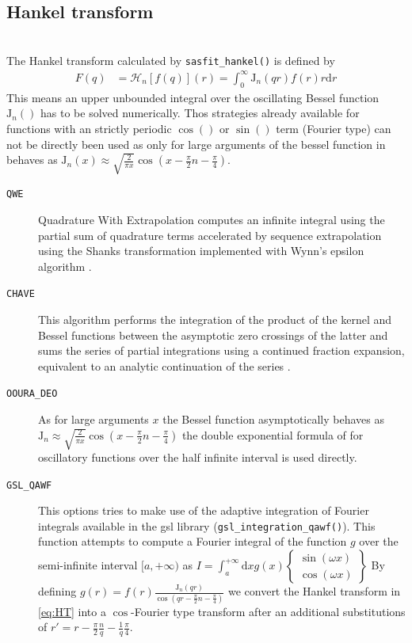 \subsection{Hankel transform} ~\\

The Hankel transform calculated by \texttt{sasfit\_hankel()} is defined by
\begin{align}\label{eq:HT}
F(q) &= \mathcal{H}_n\left[f(q)\right](r)  = \int_0^\infty \mathrm{J}_n(qr) f(r) r \mathrm{d}r
\end{align}
This means an upper unbounded integral over the oscillating Bessel function $\mathrm{J}_n()$ has to be solved numerically.
Thos strategies already available for functions with an strictly periodic $\cos()$ or $\sin()$ term (Fourier type) can not be directly been used as only for large arguments of the bessel function in behaves as $\mathrm{J}_n(x)\approx \sqrt{\frac{2}{\pi x}}\cos\left(x-\frac{\pi}{2}n-\frac{\pi}{4}\right)$.
\begin{description}
\item[\texttt{QWE}] Quadrature With Extrapolation computes an
infinite integral using the partial sum of quadrature terms
accelerated by sequence extrapolation using the Shanks transformation
implemented with Wynn's epsilon algorithm \cite{Key2012}.
\item[\texttt{CHAVE}]  This algorithm performs the integration of the product of the kernel and Bessel functions between the asymptotic zero crossings of the latter and sums the series of partial integrations using a continued fraction expansion, equivalent to an analytic continuation of the series \cite{Chave1983}.
\item[\texttt{OOURA\_DEO}] As for large arguments $x$ the Bessel function asymptotically behaves as
$\mathrm{J}_n\approx \sqrt{\frac{2}{\pi x}}\cos\left(x-\frac{\pi}{2}n-\frac{\pi}{4}\right)$ the double exponential formula of \cite{Ooura_1991} for oscillatory functions over the half infinite interval is used directly.
\item[\texttt{GSL\_QAWF}] This options tries to make use of the adaptive integration of Fourier integrals available in the gsl library (\texttt{gsl\_integration\_qawf()}). This function attempts to compute a Fourier integral of the function $g$ over the semi-infinite interval $[a,+\infty)$ as
$I = \int_a^{+\infty} \mathrm{d}x g(x)
\left\{
\begin{array}{c}
\sin{(\omega x)} \\
\cos{(\omega x)}
\end{array}
\right\}$
By defining $g(r)= f(r) \frac{\mathrm{J}_n(qr)}{\cos\left(qr-\frac{\pi}{2}n-\frac{\pi}{4}\right)}$ we convert the Hankel transform in \ref{eq:HT} into a $\cos$-Fourier type transform after an additional substitutions of $r'=r-\frac{\pi}{2}\frac{n}{q}-\frac{1}{q}\frac{\pi}{4}$.
\end{description}
